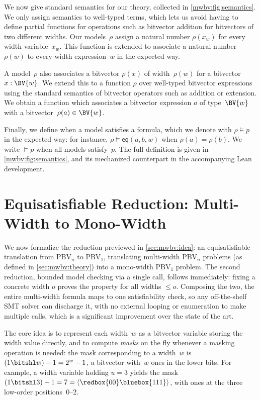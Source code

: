 We now give standard semantics for our theory, collected in
\cref{mwbv:fig:semantics}.
We only assign semantics to well-typed terms,
which lets us avoid having to define
partial functions for operations such as bitvector addition for bitvectors of
two different widths. Our models~$\rho$ assign a natural number $\rho(x_w)$ for
every width variable~$x_w$. This function is extended to associate a natural
number $\rho(w)$ to every width expression~$w$ in the expected way.

A model~$\rho$ also associates a bitvector $\rho(x)$ of width~$\rho(w)$ for a
bitvector $x : \BV{w}$.
%
We extend this to a function $\rho$ over well-typed bitvector expressions using
the standard semantics of bitvector operators such as addition or extension. We
obtain a function which associates a bitvector expression $a$ of type~$\BV{w}$
with a bitvector~$\rho(a) \in \BV{w}$.

Finally, we define when a model satisfies a formula, which we denote with $\rho
\vDash p$ in the expected way: for instance, $\rho \vDash \mathsf{eq}(a, b, w)$ when
$\rho(a) = \rho(b)$.
%
We write $\vDash p$ when all models satisfy~$p$.
The full definition is given in \cref{mwbv:fig:semantics}, and its mechanized
counterpart in the accompanying Lean development.

\section{Equisatisfiable Reduction: Multi-Width to Mono-Width}
\label{sec:mwbv:reduction}

We now formalize the reduction previewed in \cref{sec:mwbv:idea}:
an equisatisfiable translation from $\text{PBV}_n$ to $\text{PBV}_1$,
translating multi-width $\text{PBV}_n$ problems (as defined in \cref{sec:mwbv:theory})
into a mono-width $\text{PBV}_1$ problem.
The second reduction, bounded model checking via a single \qfbv{} call, follows immediately: fixing a concrete width $o$ proves
the property for all widths $\leq o$.
Composing the two, the entire multi-width formula maps to
one \qfbv{} satisfiability check, so any off-the-shelf SMT solver can discharge it,
with no external looping or enumeration to make multiple \qfbv{} calls, which is a significant improvement over the state of the art.

The core idea is to represent each width~$w$ as a bitvector variable storing the
width value directly, and to compute \emph{masks} on the fly whenever a
masking operation is needed:
the mask corresponding to a width~$w$ is $(1 \bitshl w) - 1 = 2^{w} - 1$, a
bitvector with~$w$ ones in the lower bits.
%
For example, a width variable holding $u = 3$ yields the mask
$(1 \bitshl 3) - 1 = 7 = \langle \redbox{00}\bluebox{111} \rangle$,
with ones at the three low-order positions~$0$--$2$.

